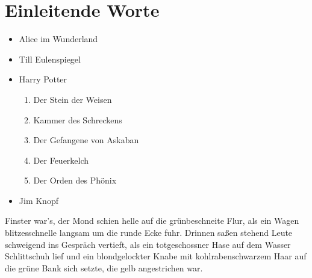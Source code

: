 

\section{Einleitende Worte}
\label{sec:einleitende Worte}
\begin{itemize}
\item Alice im Wunderland
\item Till Eulenspiegel
\item Harry Potter
\begin{enumerate}
\item Der Stein der Weisen
\item Kammer des Schreckens
\item Der Gefangene von Askaban
\item Der Feuerkelch
\item Der Orden des Phönix
\end{enumerate}
\item Jim Knopf
\end{itemize}

Finster war's, der Mond schien helle auf die grünbeschneite Flur, als
ein Wagen blitzesschnelle langsam um die runde Ecke fuhr. Drinnen
saßen stehend Leute schweigend ins Gespräch vertieft, als ein
totgeschossner Hase auf dem Wasser Schlittschuh lief und ein
blondgelockter Knabe mit kohlrabenschwarzem Haar auf die grüne Bank
sich setzte, die gelb angestrichen war.

